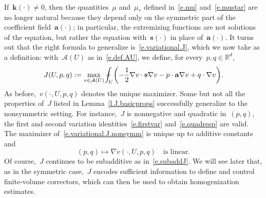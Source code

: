 \documentclass[11pt,twoside]{article} %
\numberwithin{equation}{section}
\theoremstyle{definition}
\let\originalleft\left
\let\originalright\right
\renewcommand{\left}{\mathopen{}\mathclose\bgroup\originalleft}
\renewcommand{\right}{\aftergroup\egroup\originalright}
\newcommand*{\Rd}{\ensuremath{\mathbb{R}^d}}
\newcommand{\s}{\mathbf{s}}
\renewcommand{\a}{\mathbf{a}}
\renewcommand{\k}{\mathbf{k}}
\def\Xint#1{\mathchoice
{\XXint\displaystyle\textstyle{#1}}%
{\XXint\textstyle\scriptstyle{#1}}%
{\XXint\scriptstyle\scriptscriptstyle{#1}}%
{\XXint\scriptscriptstyle\scriptscriptstyle{#1}}%
\!\int}
\def\XXint#1#2#3{{\setbox0=\hbox{$#1{#2#3}{\int}$}
\vcenter{\hbox{$#2#3$}}\kern-.5\wd0}}
\def\fint{\Xint-}
\newcommand{\A}{\mathcal{A}}
\begin{document}
If~$\k(\cdot)\neq0$, then the quantities~$\mu$ and~$\mu_*$ defined in~\eqref{e.mu} and~\eqref{e.mustar} are no longer natural because they depend only on the symmetric part of the coefficient field~$\a(\cdot)$; in particular, the extremizing functions are not solutions of the equation, but rather the equation with~$\s(\cdot)$ in place of~$\a(\cdot)$. 
It turns out that the right formula to generalize is~\eqref{e.variational.J}, which we now take as a definition: with~$\A(U)$ as in~\eqref{e.def.AU}, 
we define, for every~$p,q\in\Rd$, 
\begin{equation}
\label{e.variational.J.nonsymm}
J(U,p,q) 
:= 
\max_{v\in \mathcal{A}(U)} 
\fint_U \left( -\frac12 \nabla v\cdot \s\nabla v -p\cdot \a\nabla v + q\cdot \nabla v   \right).
\end{equation}
As before,~$v(\cdot,U,p,q)$ denotes the unique maximizer. 
Some but not all the properties of~$J$ listed in Lemma~\ref{l.J.basicprops} successfully generalize to the nonsymmetric setting. For instance,~$J$ is nonnegative and quadratic in~$(p,q)$, the first and second variation identities~\eqref{e.firstvar} and~\eqref{e.quadresp} are valid.
The maximizer of~\eqref{e.variational.J.nonsymm} is unique up to additive constants and 
\begin{equation}
\label{e.vUpq.linear.nosymm}
(p,q) \mapsto \nabla v(\cdot,U,p,q) \quad \mbox{is linear.}
\end{equation}
Of course,~$J$ continues to be subadditive as in~\eqref{e.subaddJ}. We will see later that, as in the symmetric case,~$J$ encodes sufficient information to define and control finite-volume correctors, which can then be used to obtain homogenization estimates.

\smallskip
\end{document}

